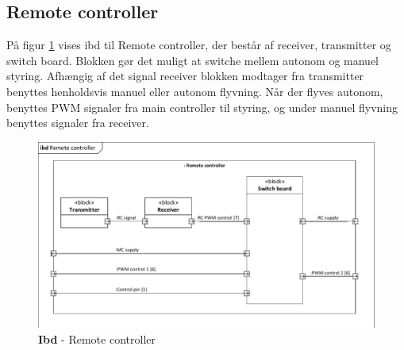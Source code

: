 \subsection{Remote controller}

På figur \ref{fig:ibd_remotecontroller} vises ibd til Remote controller, der består af receiver, transmitter og switch board. Blokken gør det muligt at switche mellem autonom og manuel styring. Afhængig af det signal receiver blokken modtager fra transmitter benyttes henholdsvis manuel eller autonom flyvning. Når der flyves autonom, benyttes PWM signaler fra main controller til styring, og under manuel flyvning benyttes signaler fra receiver.

\begin{figure}[H]
\centering
\includegraphics[width=1\textwidth]{Billeder/IBD/ibd7_remotecontroller.pdf}
\vspace{-0.5cm}
\caption{\textbf{Ibd} - Remote controller}
\label{fig:ibd_remotecontroller}
\end{figure}

